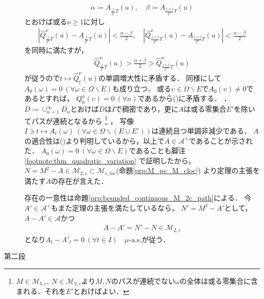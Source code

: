 \begin{prf}
\begin{description}
{					\begin{align}
						\alpha \coloneqq A_{\frac{j}{2^n}T}(u),
						\quad \beta \coloneqq A_{\frac{j+1}{2^n}T}(u)
					\end{align}
					とおけば或る$\nu \geq 1$に対し
					\begin{align}
						\left| \hat{Q}_{\frac{j}{2^n}T}^\nu(u) - A_{\frac{j}{2^n}T}(u) \right| < \frac{\alpha - \beta}{2},
						\quad \left| \hat{Q}_{\frac{j+1}{2^n}T}^\nu(u) - A_{\frac{j+1}{2^n}T}(u) \right| < \frac{\alpha - \beta}{2}
					\end{align}
					を同時に満たすが，
					\begin{align}
						\hat{Q}_{\frac{j}{2^n}T}^\nu(u) > \frac{\alpha + \beta}{2} > \hat{Q}_{\frac{j+1}{2^n}T}^\nu(u)
					\end{align}
					が従うので$t \longmapsto \hat{Q}_t^\nu(u)$の単調増大性に矛盾する．
					同様にして$A_0(\omega) = 0\ (\forall \omega \in \Omega \backslash E)$も成り立つ．
					或る$\upsilon \in \Omega \backslash E$で$A_0(\upsilon) \neq 0$であるとすれば，
					$Q^n_0(\upsilon) = 0\ (\forall n)$であるから()に矛盾する．
					\label{footnote:thm_quadratic_variation}
				}．
				$D \coloneqq \cup_{n=1}^{\infty} D_n$とおけば$D$は$I$で稠密であり，更に$A$は或る零集合$E'$を除いてパスが連続となるから
				\footnote{
					$M \in \mathcal{M}_{b,c},\ N \in \mathcal{M}_{2,c}$より$M,N$のパスが連続でない$\omega$の全体は或る零集合に含まれる．それを$E'$とおけばよい．
				}
				，
				写像$I \ni t \longmapsto A_t(\omega)\ (\forall \omega \in \Omega \backslash (E \cup E'))$は連続且つ単調非減少である．
				$A$の適合性は()より判明しているから，以上で$A \in \mathcal{A}^+$であることが示された．
				$A_0(\omega) = 0\ (\forall \omega \in \Omega \backslash E)$であることも脚注\ref{footnote:thm_quadratic_variation}
				で証明したから，$N = M^2 - A \in \mathcal{M}_{2,c} \subset \mathcal{M}_{c,loc}$(命題\ref{prp:M_pc_M_cloc})
				より定理の主張を満たす$A$の存在が言えた．
				
				存在の一意性は命題\ref{prp:bounded_continuous_M_2c_path}による．
				今$A' \in \mathcal{A}^+$もまた定理の主張を満たしているなら，
				$N' = M^2 - A'$として，$A - A' \in \mathcal{A}$かつ
				\begin{align}
					A - A' = N' - N \in \mathcal{M}_{2,c}
				\end{align}
				となり$A_t - A'_t = 0\ (\forall t \in I)\quad \mbox{$\mu$-a.s.}$が従う．
				
			\item[第二段]
				
		\end{description}
	\end{prf}